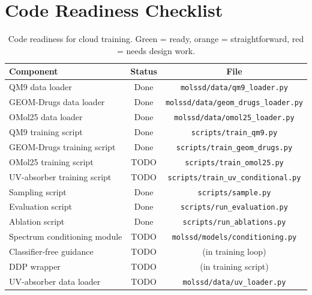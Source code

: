 \documentclass[11pt,a4paper]{article}
\begin{document}
\section{Code Readiness Checklist}

\begin{table}[h]
\centering
\begin{tabular}{@{}lcc@{}}
\toprule
\textbf{Component} & \textbf{Status} & \textbf{File} \\
\midrule
QM9 data loader & \textcolor{best}{Done} & \texttt{molssd/data/qm9\_loader.py} \\
GEOM-Drugs data loader & \textcolor{best}{Done} & \texttt{molssd/data/geom\_drugs\_loader.py} \\
OMol25 data loader & \textcolor{best}{Done} & \texttt{molssd/data/omol25\_loader.py} \\
QM9 training script & \textcolor{best}{Done} & \texttt{scripts/train\_qm9.py} \\
GEOM-Drugs training script & \textcolor{best}{Done} & \texttt{scripts/train\_geom\_drugs.py} \\
OMol25 training script & \textcolor{warn}{TODO} & \texttt{scripts/train\_omol25.py} \\
UV-absorber training script & \textcolor{warn}{TODO} & \texttt{scripts/train\_uv\_conditional.py} \\
Sampling script & \textcolor{best}{Done} & \texttt{scripts/sample.py} \\
Evaluation script & \textcolor{best}{Done} & \texttt{scripts/run\_evaluation.py} \\
Ablation script & \textcolor{best}{Done} & \texttt{scripts/run\_ablations.py} \\
Spectrum conditioning module & \textcolor{bad}{TODO} & \texttt{molssd/models/conditioning.py} \\
Classifier-free guidance & \textcolor{bad}{TODO} & (in training loop) \\
DDP wrapper & \textcolor{bad}{TODO} & (in training script) \\
UV-absorber data loader & \textcolor{bad}{TODO} & \texttt{molssd/data/uv\_loader.py} \\
\bottomrule
\end{tabular}
\caption{Code readiness for cloud training. Green = ready, orange = straightforward,
red = needs design work.}
\end{table}
\end{document}
